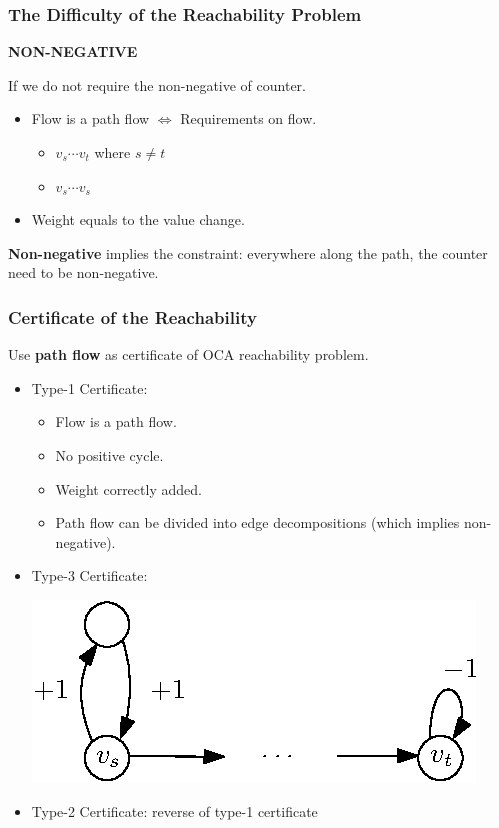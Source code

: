 \documentclass[11pt]{beamer}
\begin{document}
\begin{frame}\frametitle{The Difficulty of the Reachability Problem}
\begin{center}
\large
\textbf{NON-NEGATIVE}
\end{center}\pause
If we do not require the non-negative of counter.

\begin{itemize}
\item Flow is a path flow $\Leftrightarrow$ Requirements on flow.
\pause
\begin{itemize}
\item $v_s\cdots v_t$ where $s \ne t$

\item $v_s\cdots v_s$
\end{itemize}
\pause
\item Weight equals to the value change.
\end{itemize}
\pause
\textbf{Non-negative} implies the constraint:
everywhere along the path, the counter need to be non-negative.
\end{frame}

\begin{frame}\frametitle{Certificate of the Reachability}

Use \textbf{path flow} as certificate of OCA reachability problem.
\pause
\begin{itemize}
\item Type-1 Certificate: 
\begin{itemize}
\item Flow is a path flow.
\item No positive cycle.
\item Weight correctly added.
\item Path flow can be divided into edge decompositions (which implies non-negative).

\end{itemize}\pause


\item Type-3 Certificate:
\begin{center}
\includegraphics[scale=1]{type2.eps}
\end{center}
\pause
\item Type-2 Certificate: reverse of type-1 certificate

\end{itemize}


\end{frame}
\end{document}

